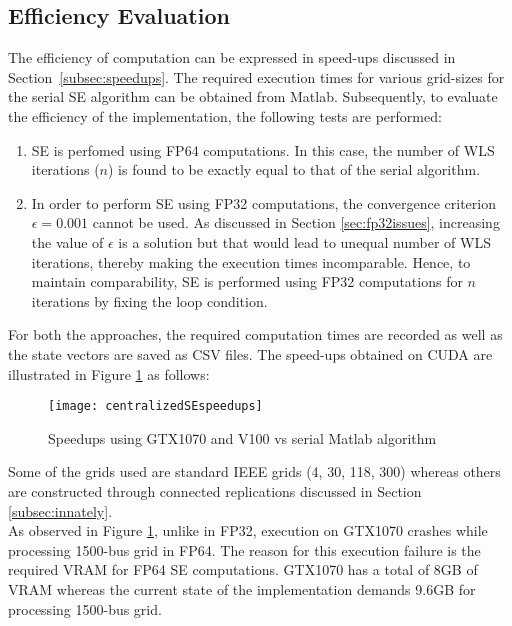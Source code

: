 \documentclass[thesis.tex]{subfiles}
\begin{document}
\subsection{Efficiency Evaluation}\label{subsec:effeval}
The efficiency of computation can be expressed in speed-ups discussed in Section~\ref{subsec:speedups}. The required execution times for various grid-sizes for the serial SE algorithm can be obtained from Matlab. Subsequently, to evaluate the efficiency of the implementation, the following tests are performed:
\begin{enumerate}
	\item SE is perfomed using FP64 computations. In this case, the number of WLS iterations ($n$) is found to be exactly equal to that of the serial algorithm. 
	\item In order to perform SE using FP32 computations, the convergence criterion $\epsilon = 0.001$ cannot be used. As discussed in Section \ref{sec:fp32issues}, increasing the value of $\epsilon$ is a solution but that would lead to unequal number of WLS iterations, thereby making the execution times incomparable. Hence, to maintain comparability, SE is performed using FP32 computations for $n$ iterations by fixing the loop condition.
\end{enumerate}

For both the approaches, the required computation times are recorded as well as the state vectors are saved as CSV files. The speed-ups obtained on CUDA are illustrated in Figure \ref{fig:centralizedSEspeedups} as follows:
\begin{figure}[H]
	\centering
	\texttt{[image: centralizedSEspeedups]}
	\caption{Speedups using GTX1070 and V100 vs serial Matlab algorithm}
	\label{fig:centralizedSEspeedups}
\end{figure}

Some of the grids used are standard IEEE grids (4, 30, 118, 300) whereas others are constructed through connected replications discussed in Section \ref{subsec:innately}.\\
As observed in Figure \ref{fig:centralizedSEspeedups}, unlike in FP32, execution on GTX1070 crashes while processing 1500-bus grid in FP64. The reason for this execution failure is the required VRAM for FP64 SE computations. GTX1070 has a total of 8GB of VRAM whereas the current state of the implementation demands 9.6GB for processing 1500-bus grid.
\end{document}
